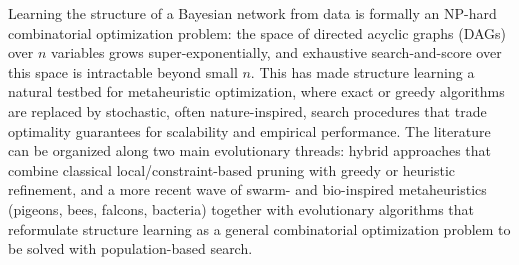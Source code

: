 Learning the structure of a Bayesian network from data is formally an NP-hard combinatorial optimization problem: the space of directed acyclic graphs (DAGs) over $n$ variables grows super-exponentially, and exhaustive search-and-score over this space is intractable beyond small $n$. This has made structure learning a natural testbed for metaheuristic optimization, where exact or greedy algorithms are replaced by stochastic, often nature-inspired, search procedures that trade optimality guarantees for scalability and empirical performance. The literature can be organized along two main evolutionary threads: hybrid approaches that combine classical local/constraint-based pruning with greedy or heuristic refinement, and a more recent wave of swarm- and bio-inspired metaheuristics (pigeons, bees, falcons, bacteria) together with evolutionary algorithms that reformulate structure learning as a general combinatorial optimization problem to be solved with population-based search.

